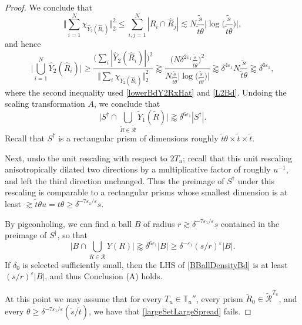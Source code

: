 \documentclass[letterpaper, reqno,11pt]{article}
\numberwithin{equation}{section}
\newcommand{\eps}{\varepsilon}
\newcommand{\tubes}{\mathbb{T}}
\numberwithin{thm}{section}
\theoremstyle{remark}
\begin{document}
\begin{proof}
We conclude that
\begin{equation}\label{L2Bd}
\Big\Vert \sum_{i=1}^N\chi_{\hat Y_2(\hat R_i)}\Big\Vert_2^2 \leq \sum_{i,j=1}^N|\hat R_i\cap \hat R_j| \lesssim  N \frac{\tilde s}{\tilde t\theta} \big|\log\big(\frac{\tilde s}{\tilde t\theta}\big)\big|,
\end{equation}
and hence
\[
\Big|\bigcup_{i=1}^N \hat Y_2(\hat R_i)\Big| 
\geq \frac{\Big(\sum_{i}|\hat Y_2(\hat R_i)|\Big)^2}{\Big\Vert \sum_{i}\chi_{\hat Y_2(\hat R_i)}\Big\Vert_2^2}
\gtrapprox \frac{\Big(N \delta^{2\eps_1}\frac{\tilde s}{\tilde t\theta}\Big)^2}{N \frac{\tilde s}{\tilde t\theta} \big|\log\big(\frac{\tilde s}{\tilde t\theta}\big)\big|}
\gtrapprox \delta^{4\eps_1}N\frac{\tilde s}{\tilde t\theta}\gtrapprox\delta^{6\eps_1},
\]
where the second inequality used \eqref{lowerBdY2RxHat} and \eqref{L2Bd}. Undoing the scaling transformation $A$, we conclude that
\[
\Big| S^\dag\cap\bigcup_{\tilde R\in\tilde{\mathcal{R}}}\tilde Y_1(\tilde R)\Big|\gtrapprox \delta^{6\eps_1} |S^\dag|.
\]
Recall that $ S^\dag$ is a rectangular prism of dimensions roughly $\tilde t\theta \times \tilde t\times \tilde t$. 

Next, undo the unit rescaling with respect to $2T_u$; recall that this unit rescaling anisotropically dilated two directions by a multiplicative factor of roughly $u^{-1}$, and left the third direction unchanged. Thus the preimage of $S^\dag$ under this rescaling is comparable to a rectangular prisms whose smallest dimension is at least $\gtrsim \tilde t\theta u=t\theta\geq \delta^{-7\eps_1/\eps}s$.


By pigeonholing, we can find a ball $ B$ of radius $r\gtrsim \delta^{-7\eps_1/\eps}s$ contained in the preimage of $S^\dag$, so that
%
\begin{equation}\label{BBallDensityBd}
\Big| B\cap\bigcup_{R\in\mathcal{R}}Y(R)\Big| \gtrapprox \delta^{6\eps_1}|B|\geq \delta^{-\eps_1}(s/r)^\eps|B|.
\end{equation}
If $\delta_0$ is selected sufficiently small, then the LHS of \eqref{BBallDensityBd} is at least $(s/r)^\eps|B|$, and thus Conclusion (A) holds. 


\medskip

At this point we may assume that for every $T_u\in\tubes_u''$, every prism $\tilde R_0\in\tilde{\mathcal{R}}^{T_u}$, and every $\theta\geq \delta^{-7\eps_1/\eps}(\tilde s/\tilde t)$, we have that \eqref{largeSetLargeSpread} fails. 


\end{proof}
\end{document}
